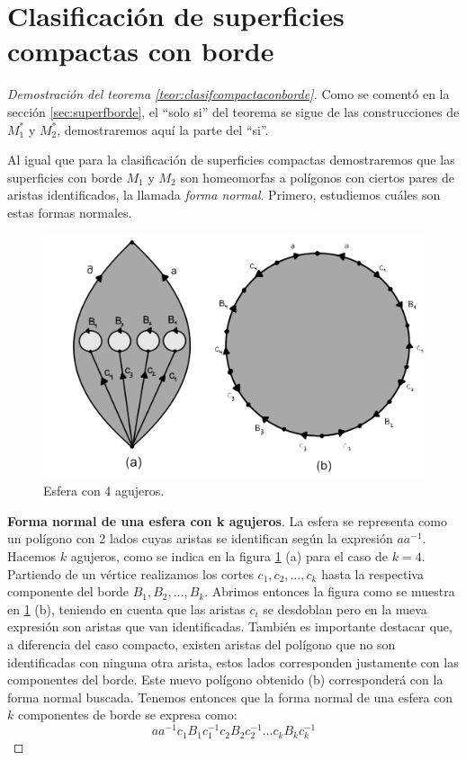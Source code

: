\documentclass[a4paper,11pt,spanish, twoside, leqno]{tfg-uam}
\theoremstyle{definition}
\begin{document}
\section{Clasificación de superficies compactas con borde}
\label{anexo:teor1}
\begin{proof}[Demostración del teorema \ref{teor:clasifcompactaconborde}]
Como se comentó en la sección \ref{sec:superfborde}, el ``solo si'' del teorema se sigue de las construcciones de $M_1^*$ y $M_2^*$, demostraremos aquí la parte del ``si''.

Al igual que para la clasificación de superficies compactas demostraremos que las superficies con borde $M_1$ y $M_2$ son homeomorfas a polígonos con ciertos pares de aristas identificados, la llamada \textit{forma normal}. Primero, estudiemos cuáles son estas formas normales.

\begin{figure}[h!]
	\centering
	\includegraphics[width=0.5\linewidth]{imagenes/esfera4agujeros.png}
	\caption{Esfera con 4 agujeros.}
    \label{imagen de forma normal de esfera con 4 agujeros}
\end{figure}

\noindent \textbf{Forma normal de una esfera con k agujeros}. La esfera se representa como un polígono con 2 lados cuyas aristas se identifican según la expresión $aa^{-1}$. Hacemos $k$ agujeros, como se indica en la figura \ref{imagen de forma normal de esfera con 4 agujeros} (a) para el caso de $k=4$. Partiendo de un vértice realizamos los cortes $c_1, c_2, \ldots, c_k$ hasta la respectiva componente del borde $B_1, B_2, \ldots, B_k$. Abrimos entonces la figura como se muestra en \ref{imagen de forma normal de esfera con 4 agujeros} (b), teniendo en cuenta que las aristas $c_i$ se desdoblan pero en la nueva expresión son aristas que van identificadas. También es importante destacar que, a diferencia del caso compacto, existen aristas del polígono que no son identificadas con ninguna otra arista, estos lados corresponden justamente con las componentes del borde. Este nuevo polígono obtenido (b) corresponderá con la forma normal buscada. Tenemos entonces que la forma normal de una esfera con $k$ componentes de borde se expresa como:
\[ aa^{-1}c_1B_1c_1^{-1}c_2B_2c_2^{-1}\ldots c_kB_kc_k^{-1} \]


\end{proof}
\end{document}
